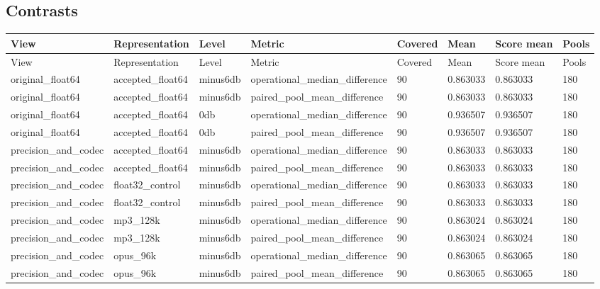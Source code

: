 \documentclass{article}
\begin{document}
\begin{landscape}
\subsection*{Contrasts}
\begin{longtable}{L{3.0cm}L{3.2cm}L{2.0cm}L{4.2cm}R{1.5cm}R{1.7cm}R{1.7cm}R{1.7cm}}
View & Representation & Level & Metric & Covered & Mean & Score mean & Pools\\\hline
\endfirsthead
View & Representation & Level & Metric & Covered & Mean & Score mean & Pools\\\hline
\endhead
original\_\allowbreak{}float64 & accepted\_\allowbreak{}float64 & minus6db & operational\_\allowbreak{}median\_\allowbreak{}difference & 90 & 0.863033 & 0.863033 & 180\\
original\_\allowbreak{}float64 & accepted\_\allowbreak{}float64 & minus6db & paired\_\allowbreak{}pool\_\allowbreak{}mean\_\allowbreak{}difference & 90 & 0.863033 & 0.863033 & 180\\
original\_\allowbreak{}float64 & accepted\_\allowbreak{}float64 & 0db & operational\_\allowbreak{}median\_\allowbreak{}difference & 90 & 0.936507 & 0.936507 & 180\\
original\_\allowbreak{}float64 & accepted\_\allowbreak{}float64 & 0db & paired\_\allowbreak{}pool\_\allowbreak{}mean\_\allowbreak{}difference & 90 & 0.936507 & 0.936507 & 180\\
precision\_\allowbreak{}and\_\allowbreak{}codec & accepted\_\allowbreak{}float64 & minus6db & operational\_\allowbreak{}median\_\allowbreak{}difference & 90 & 0.863033 & 0.863033 & 180\\
precision\_\allowbreak{}and\_\allowbreak{}codec & accepted\_\allowbreak{}float64 & minus6db & paired\_\allowbreak{}pool\_\allowbreak{}mean\_\allowbreak{}difference & 90 & 0.863033 & 0.863033 & 180\\
precision\_\allowbreak{}and\_\allowbreak{}codec & float32\_\allowbreak{}control & minus6db & operational\_\allowbreak{}median\_\allowbreak{}difference & 90 & 0.863033 & 0.863033 & 180\\
precision\_\allowbreak{}and\_\allowbreak{}codec & float32\_\allowbreak{}control & minus6db & paired\_\allowbreak{}pool\_\allowbreak{}mean\_\allowbreak{}difference & 90 & 0.863033 & 0.863033 & 180\\
precision\_\allowbreak{}and\_\allowbreak{}codec & mp3\_\allowbreak{}128k & minus6db & operational\_\allowbreak{}median\_\allowbreak{}difference & 90 & 0.863024 & 0.863024 & 180\\
precision\_\allowbreak{}and\_\allowbreak{}codec & mp3\_\allowbreak{}128k & minus6db & paired\_\allowbreak{}pool\_\allowbreak{}mean\_\allowbreak{}difference & 90 & 0.863024 & 0.863024 & 180\\
precision\_\allowbreak{}and\_\allowbreak{}codec & opus\_\allowbreak{}96k & minus6db & operational\_\allowbreak{}median\_\allowbreak{}difference & 90 & 0.863065 & 0.863065 & 180\\
precision\_\allowbreak{}and\_\allowbreak{}codec & opus\_\allowbreak{}96k & minus6db & paired\_\allowbreak{}pool\_\allowbreak{}mean\_\allowbreak{}difference & 90 & 0.863065 & 0.863065 & 180\\
\end{longtable}

\end{landscape}
\end{document}
